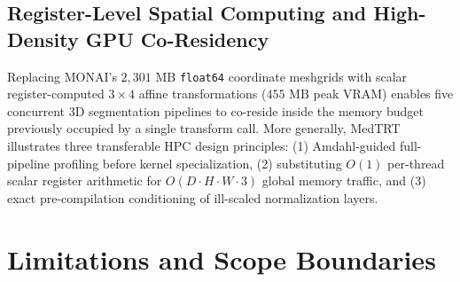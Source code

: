 \documentclass[10pt,twocolumn]{article}
\begin{document}
\subsection{Register-Level Spatial Computing and High-Density GPU Co-Residency}
Replacing MONAI's $2,301\text{ MB}$ \texttt{float64} coordinate meshgrids with scalar register-computed $3 \times 4$ affine transformations ($455\text{ MB}$ peak VRAM) enables five concurrent 3D segmentation pipelines to co-reside inside the memory budget previously occupied by a single transform call. More generally, MedTRT illustrates three transferable HPC design principles: (1) Amdahl-guided full-pipeline profiling before kernel specialization, (2) substituting $O(1)$ per-thread scalar register arithmetic for $O(D \cdot H \cdot W \cdot 3)$ global memory traffic, and (3) exact pre-compilation conditioning of ill-scaled normalization layers.

\section{Limitations and Scope Boundaries}
\label{sec:limitations}
\end{document}
